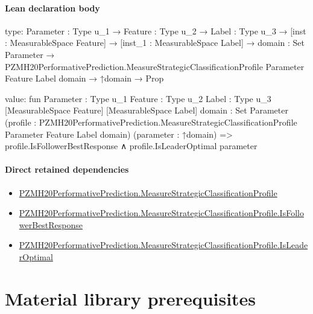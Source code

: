 \documentclass[10pt]{article}
\begin{document}
\paragraph{Lean declaration body}
\begin{ReviewVerbatim}
type:
{Parameter : Type u_1} →
  {Feature : Type u_2} →
    {Label : Type u_3} →
      [inst : MeasurableSpace Feature] →
        [inst_1 : MeasurableSpace Label] →
          {domain : Set Parameter} →
            PZMH20PerformativePrediction.MeasureStrategicClassificationProfile Parameter Feature Label domain →
              ↑domain → Prop

value:
fun {Parameter : Type u_1} {Feature : Type u_2} {Label : Type u_3} [MeasurableSpace Feature] [MeasurableSpace Label]
    {domain : Set Parameter}
    (profile : PZMH20PerformativePrediction.MeasureStrategicClassificationProfile Parameter Feature Label domain)
    (parameter : ↑domain) =>
  profile.IsFollowerBestResponse ∧ profile.IsLeaderOptimal parameter
\end{ReviewVerbatim}

\paragraph{Direct retained dependencies}
\begin{itemize}\raggedright
\item \hyperlink{governing-declaration-f8fb952103b1a09e}{PZMH20\allowbreak{}Performative\allowbreak{}Prediction.\allowbreak{}Measure\allowbreak{}Strategic\allowbreak{}Classification\allowbreak{}Profile}
\item \hyperlink{governing-declaration-724ac8f982219a67}{PZMH20\allowbreak{}Performative\allowbreak{}Prediction.\allowbreak{}Measure\allowbreak{}Strategic\allowbreak{}Classification\allowbreak{}Profile.\allowbreak{}Is\allowbreak{}Follower\allowbreak{}Best\allowbreak{}Response}
\item \hyperlink{governing-declaration-b3fffd392ec9155d}{PZMH20\allowbreak{}Performative\allowbreak{}Prediction.\allowbreak{}Measure\allowbreak{}Strategic\allowbreak{}Classification\allowbreak{}Profile.\allowbreak{}Is\allowbreak{}Leader\allowbreak{}Optimal}
\end{itemize}
\clearpage
\hypertarget{library-section-858f18808007153a}{}
\section*{Material library prerequisites}
\hypertarget{library-prerequisite-2e05b739f5b71f23}{}
\end{document}

